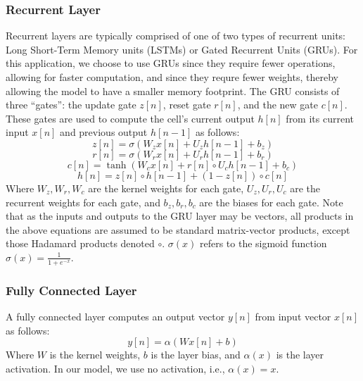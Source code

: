 \documentclass[twoside,a4paper]{article}
\begin{document}
\subsubsection{Recurrent Layer}
Recurrent layers are typically comprised of one of two types of
recurrent units: Long Short-Term Memory units (LSTMs) or Gated
Recurrent Units (GRUs). For this application, we choose to use
GRUs \cite{gru_original} since they require fewer operations,
allowing for faster computation, and since they requre fewer weights,
thereby allowing the model to have a smaller memory footprint. The
GRU consists of three ``gates'': the update gate $z[n]$, reset gate
$r[n]$, and the new gate $c[n]$. These gates are used to compute the
cell's current output $h[n]$ from its current input $x[n]$ and previous
output $h[n-1]$ as follows:
\begin{equation}
    z[n] = \sigma(W_z x[n] + U_z h[n-1] + b_z)
\end{equation}
\begin{equation}
    r[n] = \sigma(W_r x[n] + U_r h[n-1] + b_r)
\end{equation}
\begin{equation}
    c[n] = \tanh(W_c x[n] + r[n] \circ U_c h[n-1] + b_c)
\end{equation}
\begin{equation}
    h[n] = z[n] \circ h[n-1] + (1 - z[n]) \circ c[n]
\end{equation}
%
Where $W_z,W_r,W_c$ are the kernel weights for each gate,
$U_z,U_r,U_c$ are the recurrent weights for each gate, and
$b_z,b_r,b_c$ are the biases for each gate. Note that as the
inputs and outputs to the GRU layer may be vectors, all products
in the above equations are assumed to be standard matrix-vector
products, except those Hadamard products denoted $\circ$.
$\sigma(x)$ refers to the sigmoid function
$\sigma(x) = \frac{1}{1 + e^{-x}}$.
%
\subsubsection{Fully Connected Layer}
A fully connected layer computes an output vector $y[n]$ from
input vector $x[n]$ as follows:
\begin{equation}
    y[n] = \alpha(W x[n] + b)
\end{equation}
%
Where $W$ is the kernel weights, $b$ is the layer bias, and $\alpha(x)$
is the layer activation. In our model, we use no activation, i.e.,
$\alpha(x) = x$.
\end{document}
